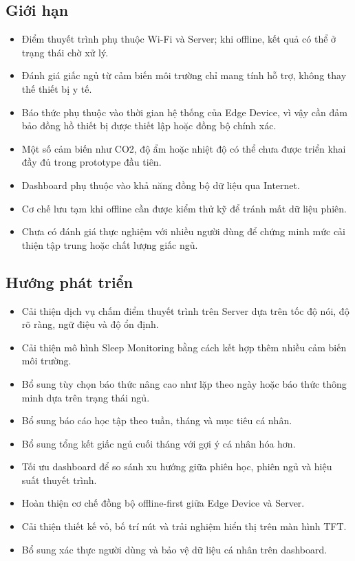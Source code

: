 \documentclass[12pt,a4paper]{article}
\begin{document}
\subsection{Giới hạn}

\begin{itemize}
    \item Điểm thuyết trình phụ thuộc Wi-Fi và Server; khi offline, kết quả có thể ở trạng thái chờ xử lý.
    \item Đánh giá giấc ngủ từ cảm biến môi trường chỉ mang tính hỗ trợ, không thay thế thiết bị y tế.
    \item Báo thức phụ thuộc vào thời gian hệ thống của Edge Device, vì vậy cần đảm bảo đồng hồ thiết bị được thiết lập hoặc đồng bộ chính xác.
    \item Một số cảm biến như CO2, độ ẩm hoặc nhiệt độ có thể chưa được triển khai đầy đủ trong prototype đầu tiên.
    \item Dashboard phụ thuộc vào khả năng đồng bộ dữ liệu qua Internet.
    \item Cơ chế lưu tạm khi offline cần được kiểm thử kỹ để tránh mất dữ liệu phiên.
    \item Chưa có đánh giá thực nghiệm với nhiều người dùng để chứng minh mức cải thiện tập trung hoặc chất lượng giấc ngủ.
\end{itemize}

\subsection{Hướng phát triển}

\begin{itemize}
    \item Cải thiện dịch vụ chấm điểm thuyết trình trên Server dựa trên tốc độ nói, độ rõ ràng, ngữ điệu và độ ổn định.
    \item Cải thiện mô hình Sleep Monitoring bằng cách kết hợp thêm nhiều cảm biến môi trường.
    \item Bổ sung tùy chọn báo thức nâng cao như lặp theo ngày hoặc báo thức thông minh dựa trên trạng thái ngủ.
    \item Bổ sung báo cáo học tập theo tuần, tháng và mục tiêu cá nhân.
    \item Bổ sung tổng kết giấc ngủ cuối tháng với gợi ý cá nhân hóa hơn.
    \item Tối ưu dashboard để so sánh xu hướng giữa phiên học, phiên ngủ và hiệu suất thuyết trình.
    \item Hoàn thiện cơ chế đồng bộ offline-first giữa Edge Device và Server.
    \item Cải thiện thiết kế vỏ, bố trí nút và trải nghiệm hiển thị trên màn hình TFT.
    \item Bổ sung xác thực người dùng và bảo vệ dữ liệu cá nhân trên dashboard.
\end{itemize}
\end{document}
